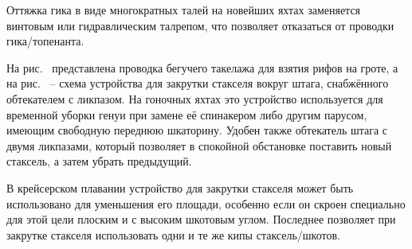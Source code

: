 Оттяжка гика в виде многократных талей на новейших яхтах заменяется
винтовым или гидравлическим талрепом, что позволяет отказаться от
проводки гика\-/топенанта.

На рис.~ представлена проводка бегучего такелажа для взятия
рифов на гроте, а на рис.~ \--- схема устройства для закрутки
стакселя вокруг штага, снабжённого обтекателем с ликпазом. На гоночных
яхтах это устройство используется для временной уборки генуи при
замене её спинакером либо другим парусом, имеющим свободную переднюю
шкаторину. Удобен также обтекатель штага с двумя ликпазами, который
позволяет в спокойной обстановке поставить новый стаксель, а затем
убрать предыдущий.

В крейсерском плавании устройство для закрутки стакселя может быть
использовано для уменьшения его площади, особенно если он скроен
специально для этой цели плоским и с высоким шкотовым углом. Последнее
позволяет при закрутке стакселя использовать одни и те же кипы
стаксель\-/шкотов.

\onecolumn

